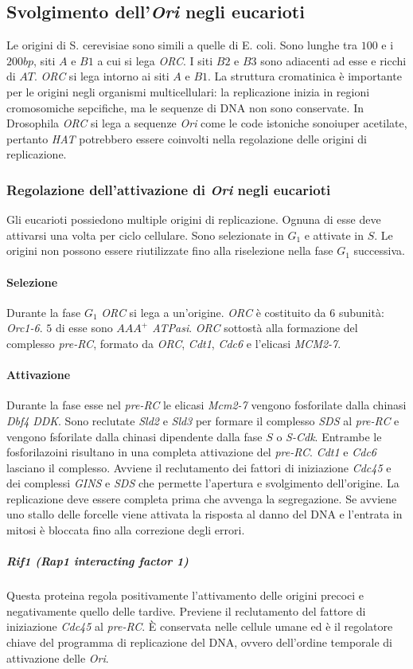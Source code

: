 \subsection{Svolgimento dell'\emph{Ori} negli eucarioti}
Le origini di S. cerevisiae sono simili a quelle di E. coli. Sono lunghe tra $100$ e i $200bp$, siti $A$ e $B1$ a cui si lega \emph{ORC}. I siti $B2$ e $B3$ sono adiacenti ad esse e 
ricchi di $AT$. \emph{ORC} si lega intorno ai siti $A$ e $B1$. La struttura cromatinica \`e importante per le origini negli organismi multicellulari: la replicazione inizia in 
regioni cromosomiche sepcifiche, ma le sequenze di DNA non sono conservate. In Drosophila \emph{ORC} si lega a sequenze \emph{Ori} come le code istoniche sonoiuper acetilate, pertanto
\emph{HAT} potrebbero essere coinvolti nella regolazione delle origini di replicazione. 
\subsubsection{Regolazione dell'attivazione di \emph{Ori} negli eucarioti}
Gli eucarioti possiedono multiple origini di replicazione. Ognuna di esse deve attivarsi una volta per ciclo cellulare. Sono selezionate in $G_1$ e attivate in $S$. Le origini non possono
essere riutilizzate fino alla riselezione nella fase $G_1$ successiva.
\paragraph{Selezione}
Durante la fase $G_1$ \emph{ORC} si lega a un'origine. \emph{ORC} \`e costituito da $6$ subunit\`a: \emph{Orc1-6}. $5$ di esse sono \emph{$AAA^+$ ATPasi}. \emph{ORC} sottost\`a alla
formazione del complesso \emph{pre-RC}, formato da \emph{ORC}, \emph{Cdt1}, \emph{Cdc6} e l'elicasi \emph{MCM2-7}. 
\paragraph{Attivazione}
Durante la fase esse nel \emph{pre-RC} le elicasi \emph{Mcm2-7} vengono fosforilate dalla chinasi \emph{Dbf4} \emph{DDK}. Sono reclutate \emph{Sld2} e \emph{Sld3} per formare il complesso
\emph{SDS} al \emph{pre-RC} e vengono fsforilate dalla chinasi dipendente dalla fase $S$ o \emph{S-Cdk}. Entrambe le fosforilazoini risultano in una completa attivazione del 
\emph{pre-RC}. \emph{Cdt1} e \emph{Cdc6} lasciano il complesso. Avviene il reclutamento dei fattori di iniziazione \emph{Cdc45} e dei complessi \emph{GINS} e \emph{SDS} che permette 
l'apertura e svolgimento dell'origine. La replicazione deve essere completa prima che avvenga la segregazione. Se avviene uno stallo delle forcelle viene attivata la risposta al 
danno del DNA e l'entrata in mitosi \`e bloccata fino alla correzione degli errori. 
\subparagraph{\emph{Rif1} (Rap1 interacting factor 1)}
Questa proteina regola positivamente l'attivamento delle origini precoci e negativamente quello delle tardive. Previene il reclutamento del fattore di iniziazione \emph{Cdc45} al 
\emph{pre-RC}. \`E conservata nelle cellule umane ed \`e il regolatore chiave del programma di replicazione del DNA, ovvero dell'ordine temporale di attivazione delle \emph{Ori}. 
